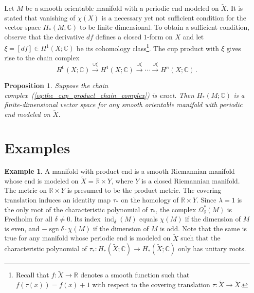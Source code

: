 \documentclass[a4paper, 12pt]{article}
\newtheorem{proposition}[theorem]{Proposition}
\theoremstyle{definition}
\newtheorem{example}[theorem]{Example}
\begin{document}
Let \({ M }\) be a smooth orientable manifold with a periodic end modeled on \({ \tilde X }\). It is stated that vanishing of \({ \chi(X) }\) is a necessary yet not sufficient condition for the vector space \({ H_{*}(M; \mathbb C) }\) to be finite dimensional. To obtain a sufficient condition, observe that the derivative \({ df }\) defines a closed \({ 1 }\)-form on \({ X }\) and let \({ \xi = [df] \in H^{1}(X; \mathbb C) }\) be its cohomology class\footnote{Recall that \({ f : \tilde X \to \mathbb R }\) denotes a smooth function such that \({ f(\tau(x)) = f(x) + 1 }\) with respect to the covering translation \({ \tau : \tilde X \to \tilde X }\).}. The cup product with \({ \xi }\) gives rise to the chain complex
\begin{equation}
    \label{eq:the_cup_product_chain_complex}
    H^{0}(X; \mathbb C) \overset{\cup \xi}{\longrightarrow} H^{1}(X; \mathbb C) \overset{\cup \xi}{\longrightarrow} \cdots \overset{\cup \xi}{\longrightarrow} H^{n}(X; \mathbb C)\,.
\end{equation}

\begin{proposition}
    Suppose the chain complex~(\ref{eq:the_cup_product_chain_complex}) is exact. Then \({ H_{*}(M; \mathbb C) }\) is a finite-dimensional vector space for any smooth orientable manifold with periodic end modeled on \({ \tilde X }\).
\end{proposition}

\section{Examples}

\begin{example}
A manifold with product end is a smooth Riemannian manifold whose end is modeled on \({ \tilde X = \mathbb R \times Y }\), where \({ Y }\) is a closed Riemannian manifold. The metric on \({ \mathbb R \times Y }\) is presumed to be the product metric. The covering translation induces an identity map \({ \tau_{*} }\) on the homology of \({ \mathbb R \times Y }\). Since \({ \lambda = 1 }\) is the only root of the characteristic polynomial of \({ \tau_{*} }\), the complex \({ \Omega_{\delta}^{*}(M) }\) is Fredholm for all \({ \delta \neq 0 }\). Its index \({ \operatorname{ind}_{\delta}(M) }\) equals \({ \chi(M) }\) if the dimension of \({ M }\) is even, and \({ -\operatorname{sgn}\delta \cdot \chi(M) }\) if the dimension of \({ M }\) is odd. Note that the same is true for any manifold whose periodic end is modeled on \({ \tilde X }\) such that the characteristic polynomial of \({ \tau_{*} : H_{*}(\tilde X; \mathbb C) \to H_{*}(\tilde X; \mathbb C) }\) only has unitary roots.
\end{example}
\end{document}
